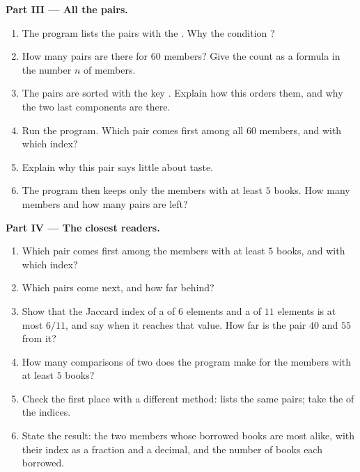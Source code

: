 \begin{problem}
\medskip\noindent\textbf{Part III --- All the pairs.}
\begin{enumerate}[resume]
  \item The program lists the pairs with the  . Why the
    condition ?
  \item How many pairs are there for $60$ members? Give the count as a formula in the number $n$ of members.
  \item The pairs are sorted with the key . Explain how this  orders them, and why the two
    last components are there.
  \item Run the program. Which pair comes first among all $60$ members, and with which index?
  \item Explain why this pair says little about taste.
  \item The program then keeps only the members with at least $5$ books. How many members and how many pairs are
    left?
\end{enumerate}

\medskip\noindent\textbf{Part IV --- The closest readers.}
\begin{enumerate}[resume]
  \item Which pair comes first among the members with at least $5$ books, and with which index?
  \item Which pairs come next, and how far behind?
  \item Show that the Jaccard index of a  of $6$ elements and a  of $11$ elements is at most $6/11$, and say when
    it reaches that value. How far is the pair $40$ and $55$ from it?
  \item How many comparisons of two  does the program make for the members with at least $5$ books?
  \item Check the first place with a different method:  lists the same pairs;
    take the  of the indices.
  \item State the result: the two members whose borrowed books are most alike, with their index as a fraction and
    a decimal, and the number of books each borrowed.
\end{enumerate}
\end{problem}
